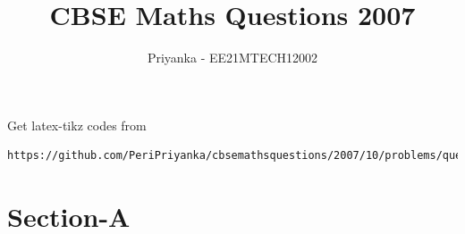 \documentclass[journal,12pt,twocolumn]{IEEEtran}
\begin{document}
     \def\rightbox#1{\makebox[0in][r]{#1}}
     \def\centbox#1{\makebox[0in]{#1}}
     \def\topbox#1{\raisebox{-\baselineskip}[0in][0in]{#1}}
     \def\midbox#1{\raisebox{-0.5\baselineskip}[0in][0in]{#1}}
\vspace{3cm}
\title{CBSE Maths Questions 2007}
\author{Priyanka - EE21MTECH12002}
\maketitle
\newpage
\bigskip
\renewcommand{\thefigure}{\theenumi}
\renewcommand{\thetable}{\theenumi}
%
Get latex-tikz codes from 
%
\begin{lstlisting}
https://github.com/PeriPriyanka/cbsemathsquestions/2007/10/problems/questions
\end{lstlisting}
\section{Section-A}
\end{document}
